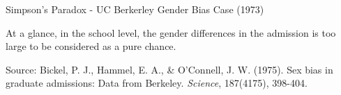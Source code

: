\documentclass{beamer}
\begin{document}
\begin{frame}{Simpson's Paradox - UC Berkerley Gender Bias Case (1973)}


At a glance, in the school level, the gender differences in the admission is too large to be considered as a pure chance. 

\begin{table}
\centering
{}
\end{table}


\begin{scriptsize}
Source: 
Bickel, P. J., Hammel, E. A., \& O'Connell, J. W. (1975). Sex bias in graduate admissions: Data from Berkeley. \textit{Science}, 187(4175), 398-404.
\end{scriptsize}


\end{frame}
\end{document}
